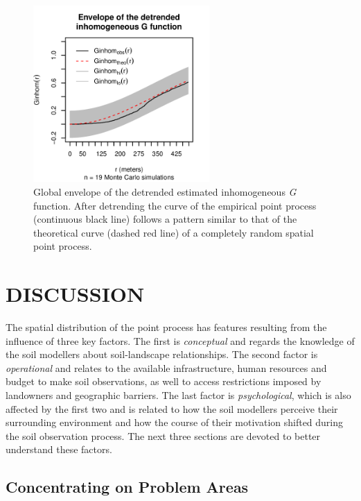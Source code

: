 \begin{figure}[!h]
 \centering
 \includegraphics[trim=0mm 0mm 0mm 35mm, clip=true, width=0.6\textwidth]{fig/chap07-fit-gest-sim}
 \caption[Global envelope of the detrended estimated inhomogeneous \emph{G} function.]{Global envelope of the 
detrended estimated inhomogeneous \emph{G} function. After detrending the curve of the empirical point process 
(continuous black line) follows a pattern similar to that of the theoretical curve (dashed red line) of a 
completely random spatial point process.}
\label{fig:chap07-trend}
\end{figure}

\section{DISCUSSION}

The spatial distribution of the point process has features resulting from the influence of three key factors. 
The first is \textit{conceptual} and regards the knowledge of the soil modellers about soil-landscape 
relationships. The second factor is \textit{operational} and relates to the available infrastructure, human 
resources and budget to make soil observations, as well to access restrictions imposed by landowners and 
geographic barriers. The last factor is \textit{psychological}, which is also affected by the first two and is 
related to how the soil modellers perceive their surrounding environment and how the course of their 
motivation shifted during the soil observation process. The next three sections are devoted to better 
understand these factors.

\subsection{Concentrating on Problem Areas}
\label{subsec:chap07-conceptual}


